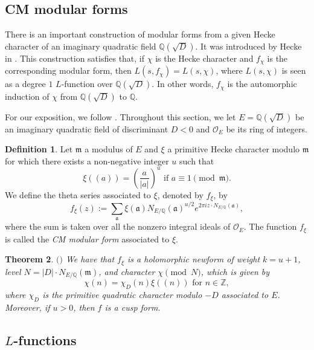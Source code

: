 \documentclass[11pt]{amsart}
\newcommand{\bigo}{\mathcal{O}}
\newcommand{\Z}{\mathbb{Z}}
\newcommand{\Q}{\mathbb{Q}}
\newtheorem{theorem}{Theorem}[section]
\theoremstyle{definition}
\newtheorem{definition}[theorem]{Definition}
\theoremstyle{remark}
\begin{document}
\subsection{CM modular forms}

There is an important construction of modular forms from a given Hecke character of an imaginary quadratic field $\Q(\sqrt{D})$. It was introduced by Hecke in \cite{HeckeDihedral}. This construction satisfies that, if $\chi$ is the Hecke character and $f_{\chi}$ is the corresponding modular form, then $L(s,f_{\chi}) = L(s,\chi)$, where $L(s,\chi)$ is seen as a degree $1$ $L$-function over $\Q(\sqrt{D})$. In other words, $f_{\chi}$ is the automorphic induction of $\chi$ from $\Q(\sqrt{D})$ to $\mathbb{Q}$.

For our exposition, we follow \cite[\S 12.3]{Iwaniec}. Throughout this section, we let $E=\Q(\sqrt{D})$ be an imaginary quadratic field of discriminant $D<0$ and $\bigo_E$ be its ring of integers.

\begin{definition}\label{Def-dihedralMaass}
Let $\mathfrak{m}$ a modulus of $E$ and $\xi$ a primitive Hecke character modulo $\mathfrak{m}$ for which there exists a non-negative integer $u$ such that $$ \xi((a)) = \left(\frac{a}{|a|}\right)^{u} \text{ if } a\equiv 1 \pmod{\mathfrak{m}}.$$ We define the theta series associated to $\xi$, denoted by $f_{\xi}$, by $$ f_{\xi}(z) := \sum_{\mathfrak{a}} \xi(\mathfrak{a}) N_{E/\Q}(\mathfrak{a})^{u/2} e^{2\pi i z\cdot N_{E/\Q}(\mathfrak{a})},$$ where the sum is taken over all the nonzero integral ideals of $\bigo_E$. The function $f_{\xi}$ is called the \textit{CM modular form} associated to $\xi$.
\end{definition}

\begin{theorem}\label{dihedralMaassCusp}
$\mathrm{(}$\cite[Thm. 12.5]{Iwaniec}$\mathrm{)}$ We have that $f_{\xi}$ is a holomorphic newform of weight $k = u+1$, level $N=|D|\cdot N_{E/\Q}(\mathfrak{m})$, and character $\chi \pmod{N}$, which is given by $$ \chi(n) = \chi_D(n) \xi((n)) \text{ for } n\in \Z,$$ where $\chi_D$ is the primitive quadratic character modulo $-D$ associated to $E$. Moreover, if $u>0$, then $f$ is a cusp form.
\end{theorem}




\subsection{\texorpdfstring{$L$}{L}-functions}
\end{document}
